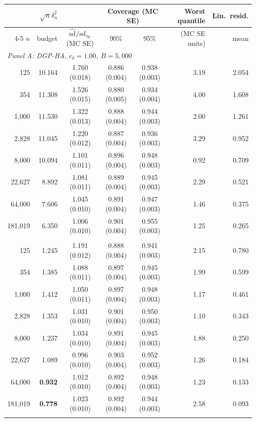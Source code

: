 \begin{tabular}{rrcccrr}
\toprule
 & $\sqrt n\delta_n^2$ & & \multicolumn{2}{c}{Coverage (MC SE)} & Worst quantile & Lin.\ resid. \\
\cmidrule(lr){4-5}
$n$ & budget & $\hat{\mathrm{sd}}/\mathrm{sd}_\infty$ (MC SE) & 90\% & 95\% & (MC SE units) & mean \\
\midrule
\multicolumn{7}{l}{\textit{Panel A: DGP-HA, $c_\delta=1.00$, $B=5,000$}} \\
\midrule
125 & 10.164 & 1.760 (0.018) & 0.886 (0.004) & 0.938 (0.003) & 3.19 & 2.054 \\
354 & 11.308 & 1.526 (0.015) & 0.880 (0.005) & 0.934 (0.004) & 4.00 & 1.608 \\
1,000 & 11.530 & 1.322 (0.013) & 0.888 (0.004) & 0.944 (0.003) & 2.00 & 1.261 \\
2,828 & 11.045 & 1.220 (0.012) & 0.887 (0.004) & 0.936 (0.003) & 3.29 & 0.952 \\
8,000 & 10.094 & 1.101 (0.011) & 0.896 (0.004) & 0.948 (0.003) & 0.92 & 0.709 \\
22,627 & 8.892 & 1.081 (0.011) & 0.889 (0.004) & 0.945 (0.003) & 2.29 & 0.521 \\
64,000 & 7.606 & 1.045 (0.010) & 0.891 (0.004) & 0.947 (0.003) & 1.46 & 0.375 \\
181,019 & 6.350 & 1.006 (0.010) & 0.901 (0.004) & 0.955 (0.003) & 1.25 & 0.265 \\
\addlinespace
\multicolumn{7}{l}{\textit{Panel B: DGP-HA, $c_\delta=0.35$, $B=5,000$}} \\
\midrule
125 & 1.245 & 1.191 (0.012) & 0.888 (0.004) & 0.941 (0.003) & 2.15 & 0.780 \\
354 & 1.385 & 1.088 (0.011) & 0.897 (0.004) & 0.945 (0.003) & 1.99 & 0.599 \\
1,000 & 1.412 & 1.050 (0.011) & 0.897 (0.004) & 0.948 (0.003) & 1.17 & 0.461 \\
2,828 & 1.353 & 1.031 (0.010) & 0.901 (0.004) & 0.950 (0.003) & 1.10 & 0.343 \\
8,000 & 1.237 & 1.034 (0.010) & 0.891 (0.004) & 0.945 (0.003) & 1.88 & 0.250 \\
22,627 & 1.089 & 0.996 (0.010) & 0.903 (0.004) & 0.952 (0.003) & 1.26 & 0.184 \\
64,000 & \textbf{0.932} & 1.012 (0.010) & 0.892 (0.004) & 0.948 (0.003) & 1.23 & 0.133 \\
181,019 & \textbf{0.778} & 1.023 (0.010) & 0.892 (0.004) & 0.944 (0.003) & 2.58 & 0.093 \\
\addlinespace

\end{tabular}

